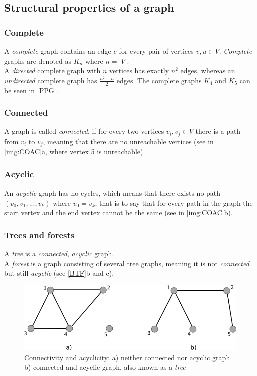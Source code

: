 \subsection{Structural properties of a graph}
\subsubsection{Complete} 
A \textit{complete} graph contains an edge $e$ for every pair of vertices $v, u \in V$. \textit{Complete} graphs are denoted as $K_n$ where $n = |V|$.\\
A \textit{directed} complete graph with $n$ vertices has exactly $n^2$ edges, whereas an \textit{undirected} complete graph has $\frac{n^2 -n}{2}$ edges. The complete graphs $K_4$ and $K_5$ can be seen in \autoref{PPG}.
\subsubsection{Connected}
A graph is called \textit{connected}, if for every two vertices $v_i, v_j \in V$ there is a path from $v_i$ to $v_j$, meaning that there are no unreachable vertices (see in \autoref{img:COAC}a, where vertex 5 is unreachable).
\subsubsection{Acyclic}
An \textit{acyclic} graph has no cycles, which means that there exists no path $(v_0, v_1,...,v_k)$ where $v_0 = v_k$, that is to say that for every path in the graph the start vertex and the end vertex cannot be the same (see in \autoref{img:COAC}b).
\subsubsection{Trees and forests}
 
A \textit{tree} is a \textit{connected}, \textit{acyclic} graph.\\
A \textit{forest} is a graph consisting of several tree graphs, meaning it is not \textit{connected} but still \textit{acyclic} (see \autoref{BTF}b and c).
\begin{figure}[h!]
\begin{center}
\includegraphics[width= \textwidth]{figures/ConnectedAcyclic.png}
\caption{Connectivity and acyclicity: a) neither connected nor acyclic graph b) connected and acyclic graph, also known as a \textit{tree}}
\label{img:COAC}
\end{center}
\end{figure}
